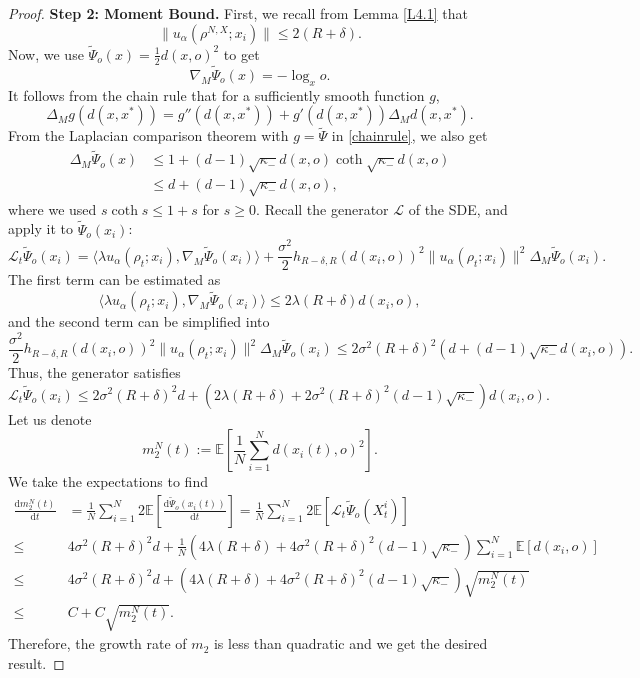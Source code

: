\documentclass[11pt]{amsart}
\newcommand{\kp}{\kappa}
\newcommand{\bE}{\mathbb{E}}
\def\d{\mathrm{d}}
\newcommand{\dm}{d} %
\newcommand{\p}{o}%
\newcommand{\dist}{d}%
\begin{document}
\begin{proof}
\noindent\textbf{Step 2: Moment Bound.} First, we recall from Lemma \ref{L4.1} that
\[
\|u_\alpha(\rho^{N,X};x_i)\|\leq 2(R+\delta).
\]
Now, we use $\tilde{\Psi}_\p(x)=\frac{1}{2}\dist(x, \p)^2$ to get
\[
\nabla_M \tilde{\Psi}_\p(x)=-\log_x\p.
\]
It follows from  the chain rule that  for a sufficiently smooth function $g$, 
\begin{equation} \label{chainrule}
\Delta_Mg(\dist(x, x^*))=g''(\dist(x, x^*))+g'(\dist(x, x^*))\Delta_M\dist(x, x^*).
\end{equation}
From the Laplacian comparison theorem with $g=\tilde\Psi$ in \eqref{chainrule}, we also get
\begin{align*}
\Delta_M\tilde{\Psi}_\p(x) &\leq 1+(\dm-1) \sqrt{\kappa_-} d(x,o) \coth{ \sqrt{\kappa_-} d(x,o) } \\
& \leq d+(d-1) \sqrt{\kappa_-}d(x,o),
\end{align*}
where we used $s\coth{s} \leq 1+s$ for $s\geq0$. Recall the generator $\mathcal{L}$ of the SDE, and apply it to $\tilde{\Psi}_\p(x_i)$:
\begin{equation*}
\mathcal{L}_t\tilde{\Psi}_\p(x_i)=\langle\lambda u_\alpha(\rho_t;x_i),\nabla_M\tilde{\Psi}_\p(x_i)\rangle+\frac{\sigma^2}{2}h_{R-\delta,R}(\dist(x_i, \p))^2\|u_\alpha(\rho_t;x_i)\|^2\Delta_M\tilde{\Psi}_\p(x_i).
\end{equation*}
The first term can be estimated as
\[
\langle\lambda u_\alpha(\rho_t;x_i),\nabla_M\tilde{\Psi}_\p(x_i)\rangle\leq 2\lambda(R+\delta)\dist(x_i, \p),
\]
and the second term can be simplified into
\[
\frac{\sigma^2}{2}h_{R-\delta,R}(\dist(x_i, \p))^2\|u_\alpha(\rho_t;x_i)\|^2\Delta_M\tilde{\Psi}_\p(x_i)\leq 2\sigma^2(R+\delta)^2\left(\dm+(\dm-1) \sqrt{\kp_-}\dist(x_i, \p)\right).
\]
Thus, the generator satisfies 
\[
\mathcal{L}_t\tilde{\Psi}_\p(x_i)\leq 2\sigma^2(R+\delta)^2 d + \left(2\lambda(R+\delta)+2\sigma^2 (R+\delta)^2 (d-1)\sqrt{\kp_-}\right) \dist(x_i,\p).
\]
Let us denote 
\[
m_2^N(t):=\bE\left[ \frac{1}{N}\sum_{i=1}^N\dist(x_i(t), \p)^2\right].
\]
We take the expectations to find
   \begin{align*}
       \frac{\d  m_2^N(t)}{\d t}&=\frac{1}{N}\sum_{i=1}^N 2\bE\left[\frac{\d  \tilde{\Psi}_\p(x_i(t))}{\d t}\right]= \frac{1}{N}\sum_{i=1}^N 2\bE\left[\mathcal{L}_t\tilde{\Psi}_\p(X_t^i)\right]\\
      \leq& 4\sigma^2(R+\delta)^2\dm+\frac{1}{N}\left(4\lambda(R+\delta)+4\sigma^2(R+\delta)^2(\dm-1)\sqrt{\kp_-}\right)\sum_{i=1}^N\bE[\dist(x_i,\p)]\\
    \leq&4\sigma^2(R+\delta)^2\dm+\left(4\lambda(R+\delta)+4\sigma^2(R+\delta)^2(\dm-1)\sqrt{\kp_-}\right)\sqrt{m_2^N(t)}\\
    \leq& C+C \sqrt{m_2^N(t)}.
   \end{align*}
   Therefore, the growth rate of $m_2$ is less than quadratic  and we get the desired result.
\end{proof}
\end{document}

